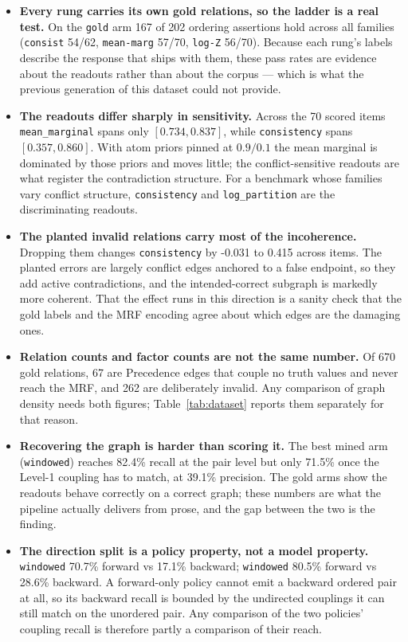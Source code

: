 \documentclass[11pt]{article}
\begin{document}
\begin{itemize}
\item \textbf{Every rung carries its own gold relations, so the ladder is a real test.} On the \texttt{gold} arm 167 of 202 ordering assertions hold across all families (\texttt{consist} 54/62, \texttt{mean-marg} 57/70, \texttt{log-Z} 56/70). Because each rung's labels describe the response that ships with them, these pass rates are evidence about the readouts rather than about the corpus --- which is what the previous generation of this dataset could not provide.
\item \textbf{The readouts differ sharply in sensitivity.} Across the 70 scored items \texttt{mean\_marginal} spans only $[0.734, 0.837]$, while \texttt{consistency} spans $[0.357, 0.860]$. With atom priors pinned at $0.9/0.1$ the mean marginal is dominated by those priors and moves little; the conflict-sensitive readouts are what register the contradiction structure. For a benchmark whose families vary conflict structure, \texttt{consistency} and \texttt{log\_partition} are the discriminating readouts.
\item \textbf{The planted invalid relations carry most of the incoherence.} Dropping them changes \texttt{consistency} by -0.031 to 0.415 across items. The planted errors are largely conflict edges anchored to a false endpoint, so they add active contradictions, and the intended-correct subgraph is markedly more coherent. That the effect runs in this direction is a sanity check that the gold labels and the MRF encoding agree about which edges are the damaging ones.
\item \textbf{Relation counts and factor counts are not the same number.} Of 670 gold relations, 67 are Precedence edges that couple no truth values and never reach the MRF, and 262 are deliberately invalid. Any comparison of graph density needs both figures; Table~\ref{tab:dataset} reports them separately for that reason.
\item \textbf{Recovering the graph is harder than scoring it.} The best mined arm (\texttt{windowed}) reaches 82.4\% recall at the pair level but only 71.5\% once the Level-1 coupling has to match, at 39.1\% precision. The gold arms show the readouts behave correctly on a correct graph; these numbers are what the pipeline actually delivers from prose, and the gap between the two is the finding.
\item \textbf{The direction split is a policy property, not a model property.} \texttt{windowed} 70.7\% forward vs 17.1\% backward; \texttt{windowed} 80.5\% forward vs 28.6\% backward. A forward-only policy cannot emit a backward ordered pair at all, so its backward recall is bounded by the undirected couplings it can still match on the unordered pair. Any comparison of the two policies' coupling recall is therefore partly a comparison of their reach.

\end{itemize}
\end{document}

